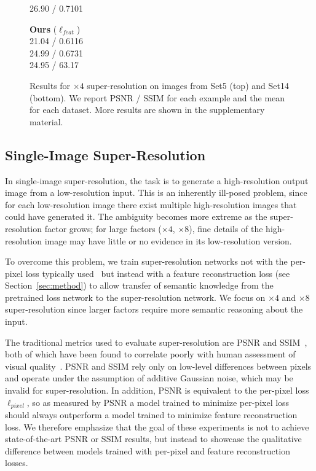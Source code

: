 \documentclass[runningheads]{llncs}
\begin{document}
\begin{figure}[t]
\begin{minipage}{\mywidth}
        26.90 / 0.7101
  \end{minipage}
  \begin{minipage}{\mywidth}
    \centering \textbf{Ours} ($\ell_{feat}$) \\  21.04 / 0.6116 \\ 24.99 / 0.6731 \\ 24.95 / 63.17
  \end{minipage}
  \vspace{-3mm}
  \caption{Results for $\times4$ super-resolution on images
    from Set5 (top) and Set14 (bottom). We report PSNR / SSIM for each example
    and the mean for each dataset. More results are shown in the supplementary material.
  }
  \label{fig:SR-4x-results}
  \vspace{-7mm}
\end{figure}

\vspace{-3mm}
\subsection{Single-Image Super-Resolution}
\label{sec:super-res}
In single-image super-resolution, the task is to generate a high-resolution output image from
a low-resolution input. This is an inherently ill-posed problem, since for each low-resolution
image there exist multiple high-resolution images that could have generated it. The ambiguity
becomes more extreme as the super-resolution factor grows; for large factors ($\times4$, $\times8$),
fine details of the high-resolution image may have little or no evidence in its low-resolution version.



To overcome this problem, we train super-resolution networks not with the per-pixel
loss typically used~\cite{dong2015image} but instead with a feature reconstruction
loss (see Section~\ref{sec:method}) to allow transfer of semantic knowledge from
the pretrained loss network to the super-resolution network. We focus on $\times4$ and $\times8$
super-resolution since larger factors require more semantic reasoning about the input.

The traditional metrics used to evaluate super-resolution are PSNR and SSIM~\cite{wang2004image},
both of which have been found to correlate poorly with human assessment of visual
quality~\cite{hanhart2013benchmarking,wang2009mean,huynh2008scope,sheikh2006statistical,kundu2015full}.
PSNR and SSIM rely only on low-level differences between pixels and operate under the
assumption of additive Gaussian noise, which may be invalid for super-resolution. In addition, PSNR
is equivalent to the per-pixel loss $\ell_{pixel}$, so as measured by PSNR a model trained to minimize
per-pixel loss should always outperform a model trained to minimize feature reconstruction loss.
We therefore emphasize that the goal of these experiments is not to achieve state-of-the-art PSNR or
SSIM results, but instead to showcase the qualitative difference between models trained with per-pixel
and feature reconstruction losses.
\end{document}
